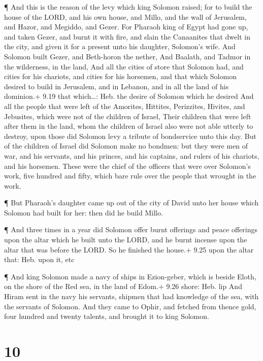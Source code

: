  ¶ And this is the reason of the levy which king Solomon
raised; for to build the house of the LORD, and his own house, and
Millo, and the wall of Jerusalem, and Hazor, and Megiddo, and Gezer.
 For Pharaoh king of Egypt had gone up, and taken Gezer,
and burnt it with fire, and slain the Canaanites that dwelt in the city,
and given it for a present unto his daughter, Solomon's wife.
 And Solomon built Gezer, and Beth-horon the nether,
 And Baalath, and Tadmor in the wilderness, in the land,
 And all the cities of store that Solomon had, and cities
for his chariots, and cities for his horsemen, and that which Solomon
desired to build in Jerusalem, and in Lebanon, and in all the land of
his dominion.+ 9.19 that which\ldots: Heb. the desire of Solomon which
he desired  And all the people that were left of the
Amorites, Hittites, Perizzites, Hivites, and Jebusites, which were not
of the children of Israel,  Their children that were left
after them in the land, whom the children of Israel also were not able
utterly to destroy, upon those did Solomon levy a tribute of bondservice
unto this day.  But of the children of Israel did Solomon
make no bondmen: but they were men of war, and his servants, and his
princes, and his captains, and rulers of his chariots, and his horsemen.
 These were the chief of the officers that were over
Solomon's work, five hundred and fifty, which bare rule over the people
that wrought in the work.

 ¶ But Pharaoh's daughter came up out of the city of David
unto her house which Solomon had built for her: then did he build Millo.

 ¶ And three times in a year did Solomon offer burnt
offerings and peace offerings upon the altar which he built unto the
LORD, and he burnt incense upon the altar that was before the LORD. So
he finished the house.+ 9.25 upon the altar that: Heb. upon it, etc

 ¶ And king Solomon made a navy of ships in Ezion-geber,
which is beside Eloth, on the shore of the Red sea, in the land of
Edom.+ 9.26 shore: Heb. lip  And Hiram sent in the navy his
servants, shipmen that had knowledge of the sea, with the servants of
Solomon.  And they came to Ophir, and fetched from thence
gold, four hundred and twenty talents, and brought it to king Solomon.

\hypertarget{section-9}{%
\section{10}\label{section-9}}

